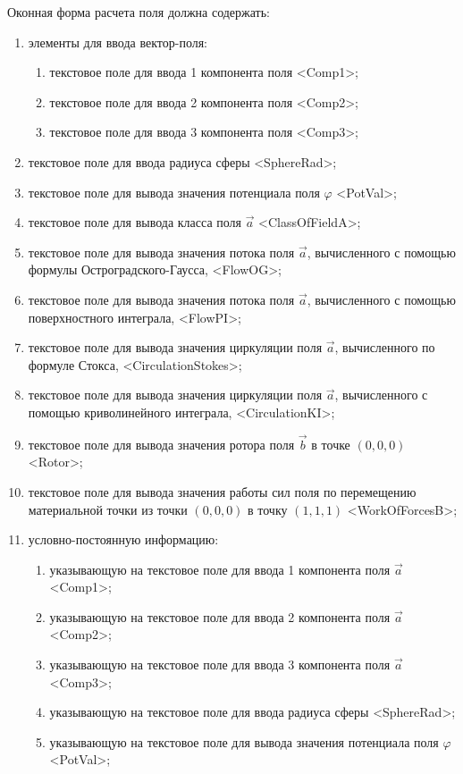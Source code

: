 \documentclass[14pt,a4paper,final]{extreport}
\begin{document}
Оконная форма расчета поля должна содержать:
\begin{enumerate}[label=\arabic*.,ref=\arabic*]
	\item элементы для ввода вектор-поля:
		\begin{enumerate}[label=\asbuk*)]
			\item текстовое поле для ввода 1 компонента поля <Comp1>;
			\item текстовое поле для ввода 2 компонента поля <Comp2>;
			\item текстовое поле для ввода 3 компонента поля <Comp3>;
		\end{enumerate}
	\item текстовое поле для ввода радиуса сферы <SphereRad>;
	\item текстовое поле для вывода значения потенциала поля \( \varphi \) <PotVal>;
	\item текстовое поле для вывода класса поля \( \vec a \) <ClassOfFieldA>;
	\item текстовое поле для вывода значения потока поля \( \vec a \), вычисленного с помощью формулы Остроградского-Гаусса, <FlowOG>;
	\item текстовое поле для вывода значения потока поля \( \vec a \), вычисленного с помощью поверхностного интеграла, <FlowPI>;
	\item текстовое поле для вывода значения циркуляции поля \( \vec a \), вычисленного по формуле Стокса, <CirculationStokes>;
	\item текстовое поле для вывода значения циркуляции поля \( \vec a \), вычисленного с помощью криволинейного интеграла, <CirculationKI>;
	\item текстовое поле для вывода значения ротора поля \( \vec b \) в точке \( (0, 0, 0) \) <Rotor>;
	\item текстовое поле для вывода значения работы сил поля по перемещению материальной точки из точки  \( (0, 0, 0) \) в точку \( (1, 1, 1) \) <WorkOfForcesB>;

	\item условно-постоянную информацию:
		\begin{enumerate}[label=\asbuk*)]
			\item указывающую на текстовое поле для ввода 1 компонента поля \( \vec a \) <Comp1>;
			\item указывающую на текстовое поле для ввода 2 компонента поля \( \vec a \) <Comp2>;
			\item указывающую на текстовое поле для ввода 3 компонента поля \( \vec a \) <Comp3>;
			\item указывающую на текстовое поле для ввода радиуса сферы <SphereRad>;
			\item указывающую на текстовое поле для вывода значения потенциала поля \( \varphi \) <PotVal>;


\end{enumerate}
\end{enumerate}
\end{document}

